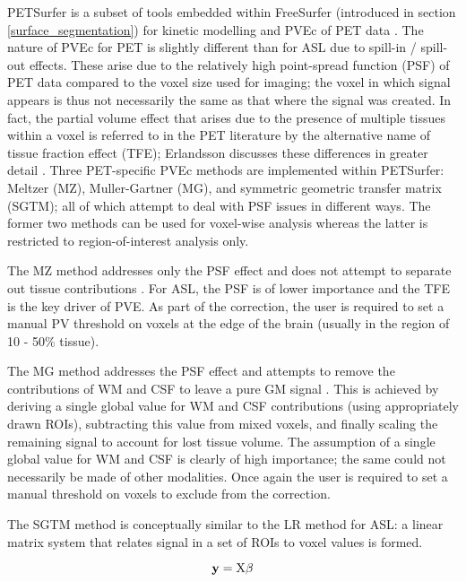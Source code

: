 PETSurfer is a subset of tools embedded within FreeSurfer (introduced in section \ref{surface_segmentation}) for kinetic modelling and PVEc of PET data \cite{Greve2016}. The nature of PVEc for PET is slightly different than for ASL due to spill-in / spill-out effects. These arise due to the relatively high point-spread function (PSF) of PET data compared to the voxel size used for imaging; the voxel in which signal appears is thus not necessarily the same as that where the signal was created. In fact, the partial volume effect that arises due to the presence of multiple tissues within a voxel is referred to in the PET literature by the alternative name of tissue fraction effect (TFE); Erlandsson discusses these differences in greater detail \cite{Erlandsson2012}. Three PET-specific PVEc methods are implemented within PETSurfer: Meltzer (MZ), Muller-Gartner (MG), and symmetric geometric transfer matrix (SGTM); all of which attempt to deal with PSF issues in different ways. The former two methods can be used for voxel-wise analysis whereas the latter is restricted to region-of-interest analysis only. 

The MZ method addresses only the PSF effect and does not attempt to separate out tissue contributions \cite{Meltzer1990}. For ASL, the PSF is of lower importance and the TFE is the key driver of PVE. As part of the correction, the user is required to set a manual PV threshold on voxels at the edge of the brain (usually in the region of 10 - 50\% tissue). 

The MG method addresses the PSF effect and attempts to remove the contributions of WM and CSF to leave a pure GM signal \cite{Muller-Gartner1992a}. This is achieved by deriving a single global value for WM and CSF contributions (using appropriately drawn ROIs), subtracting this value from mixed voxels, and finally scaling the remaining signal to account for lost tissue volume. The assumption of a single global value for WM and CSF is clearly of high importance; the same could not necessarily be made of other modalities. Once again the user is required to set a manual threshold on voxels to exclude from the correction. 

The SGTM method \cite{Labbe1998} is conceptually similar to the LR method for ASL: a linear matrix system that relates signal in a set of ROIs to voxel values is formed. 

\begin{equation}
\mathbf{y} = \mathrm{X}\mathbf{\beta}
\end{equation}

